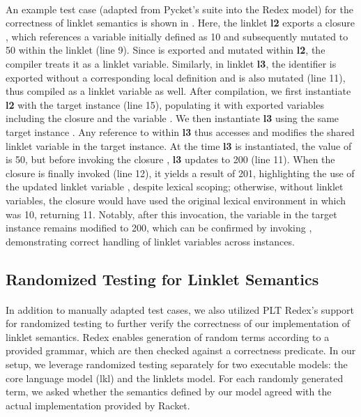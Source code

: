 		\paragraph{}%
			An example test case (adapted from Pycket's suite into the Redex model) for the correctness of linklet semantics is shown in . Here, the linklet \textbf{l2} exports a closure , which references a variable  initially defined as 10 and subsequently mutated to 50 within the linklet (line 9). Since  is exported and mutated within \textbf{l2}, the compiler treats it as a linklet variable. Similarly, in linklet \textbf{l3}, the identifier  is exported without a corresponding local definition and is also mutated (line 11), thus compiled as a linklet variable as well. After compilation, we first instantiate \textbf{l2} with the target instance  (line 15), populating it with exported variables including the closure  and the variable . We then instantiate \textbf{l3} using the same target instance . Any reference to  within \textbf{l3} thus accesses and modifies the shared linklet variable in the target instance. At the time \textbf{l3} is instantiated, the value of  is 50, but before invoking the closure , \textbf{l3} updates  to 200 (line 11). When the closure  is finally invoked (line 12), it yields a result of 201, highlighting the use of the updated linklet variable , despite lexical scoping; otherwise, without linklet variables, the closure would have used the original lexical environment in which  was 10, returning 11. Notably, after this invocation, the variable  in the target instance  remains modified to 200, which can be confirmed by invoking , demonstrating correct handling of linklet variables across instances.

		\subsection{Randomized Testing for Linklet Semantics}

			\paragraph{}%
				In addition to manually adapted test cases, we also utilized PLT Redex's support for randomized testing to further verify the correctness of our implementation of linklet semantics. Redex enables generation of random terms according to a provided grammar, which are then checked against a correctness predicate. In our setup, we leverage randomized testing separately for two executable models: the core language model (\gls{lkl}) and the linklets model. For each randomly generated term, we asked whether the semantics defined by our model agreed with the actual implementation provided by Racket.

